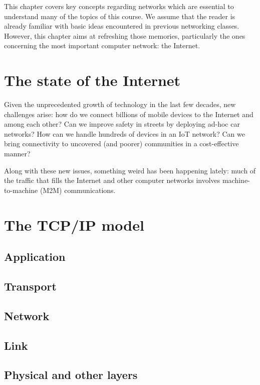 \marginpar{\minitoc}

This chapter covers key concepts regarding networks which
are essential to understand many of the topics of this
course. We assume that the reader is already familiar
with basic ideas encountered in previous networking classes.
However, this chapter aims at refreshing those memories,
particularly the ones concerning the most important computer
network: the Internet.


\section{The state of the Internet}
Given the unprecedented growth of technology in the
last few decades, new challenges arise: how do we
connect billions of mobile devices to the Internet
and among each other? Can we improve safety in streets
by deploying ad-hoc car networks? How can we handle
hundreds of devices in an IoT network? Can we bring
connectivity to uncovered (and poorer) communities
in a cost-effective manner?

Along with these new issues, something weird has
been happening lately: much of the traffic that
fills the Internet and other computer networks
involves machine-to-machine (M2M) communications.


\section{The TCP/IP model}

\subsection{Application}

\subsection{Transport}

\subsection{Network}

\subsection{Link}

\subsection{Physical and other layers}


